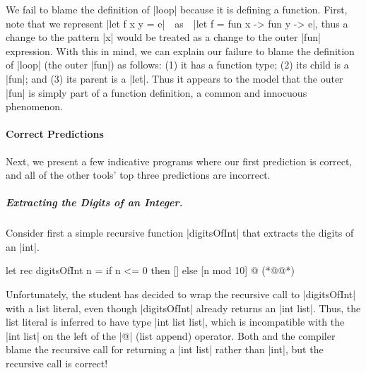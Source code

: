 We fail to blame the definition of |loop| because it is defining a
function.
%
First, note that we represent |let f x y = e|\ \ as\ \ |let f = fun x -> fun y -> e|,
thus a change to the pattern |x| would be treated as a change to the outer
|fun| expression.
%
With this in mind, we can explain our failure to blame the definition of
|loop| (the outer |fun|) as follows:
%
(1) it has a function type;
%
(2) its child is a |fun|; and
%
(3) its parent is a |let|.
%
Thus it appears to the model that the outer |fun| is simply part of a
function definition, a common and innocuous phenomenon.


\paragraph{Correct Predictions}
\label{sec:nate:correct-predictions}

Next, we present a few indicative programs where our first prediction is
correct, and all of the other tools' top three predictions are
incorrect.

\subparagraph{Extracting the Digits of an Integer.}
Consider first a simple recursive function |digitsOfInt| that extracts
the digits of an |int|.
%
\begin{ecode}
  let rec digitsOfInt n =
    if n <= 0 then
      []
    else
      [n mod 10] @ (*@@*)
\end{ecode}
%
Unfortunately, the student has decided to wrap the recursive call to
|digitsOfInt| with a list literal, even though |digitsOfInt| already
returns an |int list|.
%
Thus, the list literal is inferred to have type |int list list|, which
is incompatible with the |int list| on the left of the |@| (list append)
operator.
%
Both \sherrloc and the \ocaml compiler blame the recursive call for
returning a |int list| rather than |int|, but the recursive call is
correct!

